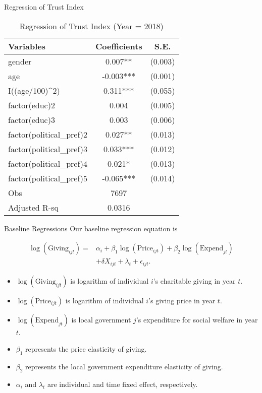 \documentclass[
  ignorenonframetext,
]{beamer}
\providecommand{\tightlist}{%
  \setlength{\itemsep}{0pt}\setlength{\parskip}{0pt}}
\begin{document}
\begin{frame}{Regression of Trust Index}
\protect\hypertarget{regression-of-trust-index}{}
\begin{table}

\caption{\label{tab:kableTabTrustReg}Regression of Trust Index (Year = 2018)}
\centering
\begin{tabular}[t]{lcc}
\toprule
Variables & Coefficients & S.E.\\
\midrule
gender & 0.007** & (0.003)\\
age & -0.003*** & (0.001)\\
I((age/100)\textasciicircum{}2) & 0.311*** & (0.055)\\
factor(educ)2 & 0.004 & (0.005)\\
factor(educ)3 & 0.003 & (0.006)\\
factor(political\_pref)2 & 0.027** & (0.013)\\
factor(political\_pref)3 & 0.033*** & (0.012)\\
factor(political\_pref)4 & 0.021* & (0.013)\\
factor(political\_pref)5 & -0.065*** & (0.014)\\
Obs & 7697 & \\
Adjusted R-sq & 0.0316 & \\
\bottomrule
\end{tabular}
\end{table}
\end{frame}

\begin{frame}{Baseline Regressions}
\protect\hypertarget{baseline-regressions}{}
Our baseline regression equation is

\begin{align*}
    \log(\text{Giving}_{ijt}) = 
    &\alpha_i + \beta_1 \log(\text{Price}_{ijt}) + \beta_2 \log(\text{Expend}_{jt}) \\
    &+ \delta X_{ijt} + \lambda_t + \epsilon_{ijt}.
\end{align*}

\begin{itemize}
\tightlist
\item
  \(\log(\text{Giving}_{ijt})\) is logarithm of individual \(i\)'s
  charitable giving in year \(t\).
\item
  \(\log(\text{Price}_{ijt})\) is logarithm of individual \(i\)'s giving
  price in year \(t\).
\item
  \(\log(\text{Expend}_{jt})\) is local government \(j\)'s expenditure
  for social welfare in year \(t\).
\item
  \(\beta_1\) represents the price elasticity of giving.
\item
  \(\beta_2\) represents the local government expenditure elasticity of
  giving.
\item
  \(\alpha_i\) and \(\lambda_t\) are individual and time fixed effect,
  respectively.
\end{itemize}
\end{frame}
\end{document}
